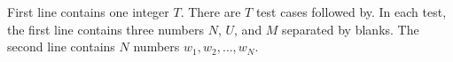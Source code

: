 First line contains one integer $T$. 
There are $T$ test cases followed by.
In each test, the first line contains three numbers $N$, $U$, and $M$ 
separated by blanks. 
The second line contains $N$ numbers $w_1,w_2,\ldots,w_N$.

